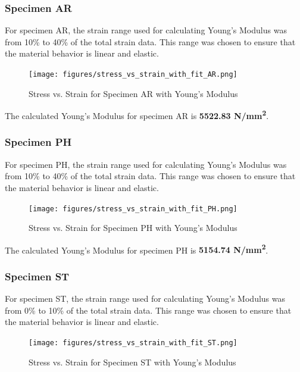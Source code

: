 \documentclass{article}
\begin{document}
\subsubsection{Specimen AR}

For specimen AR, the strain range used for calculating Young's Modulus was from 10\% to 40\% of the total strain data. This range was chosen to ensure that the material behavior is linear and elastic.

\begin{figure}[H]
    \centering
    \texttt{[image: figures/stress\_vs\_strain\_with\_fit\_AR.png]}
    \caption{Stress vs. Strain for Specimen AR with Young's Modulus}
    \label{fig:stress_strain_AR}
\end{figure}

The calculated Young's Modulus for specimen AR is \textbf{5522.83 N/mm\textsuperscript{2}}.
\newpage
\subsubsection{Specimen PH}

For specimen PH, the strain range used for calculating Young's Modulus was from 10\% to 40\% of the total strain data. This range was chosen to ensure that the material behavior is linear and elastic.

\begin{figure}[H]
    \centering
    \texttt{[image: figures/stress\_vs\_strain\_with\_fit\_PH.png]}
    \caption{Stress vs. Strain for Specimen PH with Young's Modulus}
    \label{fig:stress_strain_PH}
\end{figure}

The calculated Young's Modulus for specimen PH is \textbf{5154.74 N/mm\textsuperscript{2}}.
\newpage
\subsubsection{Specimen ST}

For specimen ST, the strain range used for calculating Young's Modulus was from 0\% to 10\% of the total strain data. This range was chosen to ensure that the material behavior is linear and elastic.

\begin{figure}[H]
    \centering
    \texttt{[image: figures/stress\_vs\_strain\_with\_fit\_ST.png]}
    \caption{Stress vs. Strain for Specimen ST with Young's Modulus}
    \label{fig:stress_strain_ST}
\end{figure}
\end{document}
